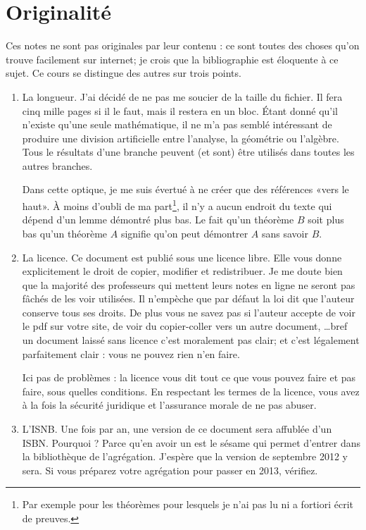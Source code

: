 

\section*{Originalité}

Ces notes ne sont pas originales par leur contenu : ce sont toutes des choses qu'on trouve facilement sur internet; je crois que la bibliographie est éloquente à ce sujet. Ce cours se distingue des autres sur trois points.
\begin{enumerate}
    \item
        La longueur. J'ai décidé de ne pas me soucier de la taille du fichier. Il fera cinq mille pages si il le faut, mais il restera en un bloc. Étant donné qu'il n'existe qu'une seule mathématique, il ne m'a pas semblé intéressant de produire une division artificielle entre l'analyse, la géométrie ou l'algèbre. Tous le résultats d'une branche peuvent (et sont) être utilisés dans toutes les autres branches.

        Dans cette optique, je me suis évertué à ne créer que des références «vers le haut». À moins d'oubli de ma part\footnote{Par exemple pour les théorèmes pour lesquels je n'ai pas lu ni a fortiori écrit de preuves.}, il n'y a aucun endroit du texte qui dépend d'un lemme démontré plus bas. Le fait qu'un théorème \( B\) soit plus bas qu'un théorème \( A\) signifie qu'on peut démontrer \( A\) sans savoir \( B\).

    \item
        La licence. Ce document est publié sous une licence libre. Elle vous donne explicitement le droit de copier, modifier et redistribuer. Je me doute bien que la majorité des professeurs qui mettent leurs notes en ligne ne seront pas fâchés de les voir utilisées. Il n'empèche que par défaut la loi dit que l'auteur conserve tous ses droits. De plus vous ne savez pas si l'auteur accepte de voir le pdf sur votre site, de voir du copier-coller vers un autre document, \ldots bref un document laissé sans licence c'est moralement pas clair; et c'est légalement parfaitement clair : vous ne pouvez rien n'en faire. 

        Ici pas de problèmes : la licence vous dit tout ce que vous pouvez faire et pas faire, sous quelles conditions. En respectant les termes de la licence, vous avez à la fois la sécurité juridique et l'assurance morale de ne pas abuser.
    \item
        L'ISNB. Une fois par an, une version de ce document sera affublée d'un ISBN. Pourquoi ? Parce qu'en avoir un est le sésame qui permet d'entrer dans la bibliothèque de l'agrégation. J'espère que la version de septembre 2012 y sera. Si vous préparez votre agrégation pour passer en 2013, vérifiez.       
\end{enumerate}

